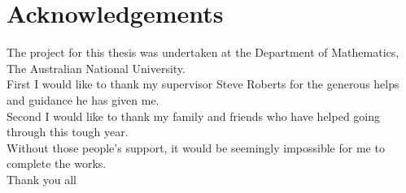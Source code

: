 
\chapter*{Acknowledgements}\label{acknowledgements}


The project for this thesis was undertaken at the Department of Mathematics, The Australian National University.\\
First I would like to thank my supervisor Steve Roberts for the generous helps and guidance he has given me. \\

Second I would like to thank my family and friends who have helped going through this tough year.\\

Without those people's support, it would be seemingly impossible for me to complete the works.\\

Thank you all
